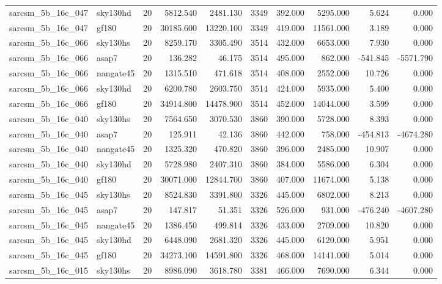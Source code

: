 \begin{longtable}{llrrrrrrrr}
sarcsm\_5b\_16c\_047 & sky130hd & 20 & 5812.540 & 2481.130 & 3349 & 392.000 & 5295.000 & 5.624 & 0.000 \\
sarcsm\_5b\_16c\_047 & gf180 & 20 & 30185.600 & 13220.100 & 3349 & 419.000 & 11561.000 & 3.189 & 0.000 \\
sarcsm\_5b\_16c\_066 & sky130hs & 20 & 8259.170 & 3305.490 & 3514 & 432.000 & 6653.000 & 7.930 & 0.000 \\
sarcsm\_5b\_16c\_066 & asap7 & 20 & 136.282 & 46.175 & 3514 & 495.000 & 862.000 & -541.845 & -5571.790 \\
sarcsm\_5b\_16c\_066 & nangate45 & 20 & 1315.510 & 471.618 & 3514 & 408.000 & 2552.000 & 10.726 & 0.000 \\
sarcsm\_5b\_16c\_066 & sky130hd & 20 & 6200.780 & 2603.750 & 3514 & 424.000 & 5935.000 & 5.400 & 0.000 \\
sarcsm\_5b\_16c\_066 & gf180 & 20 & 34914.800 & 14478.900 & 3514 & 452.000 & 14044.000 & 3.599 & 0.000 \\
sarcsm\_5b\_16c\_040 & sky130hs & 20 & 7564.650 & 3070.530 & 3860 & 390.000 & 5728.000 & 8.393 & 0.000 \\
sarcsm\_5b\_16c\_040 & asap7 & 20 & 125.911 & 42.136 & 3860 & 442.000 & 758.000 & -454.813 & -4674.280 \\
sarcsm\_5b\_16c\_040 & nangate45 & 20 & 1325.320 & 470.820 & 3860 & 396.000 & 2485.000 & 10.907 & 0.000 \\
sarcsm\_5b\_16c\_040 & sky130hd & 20 & 5728.980 & 2407.310 & 3860 & 384.000 & 5586.000 & 6.304 & 0.000 \\
sarcsm\_5b\_16c\_040 & gf180 & 20 & 30071.000 & 12844.700 & 3860 & 407.000 & 11674.000 & 5.138 & 0.000 \\
sarcsm\_5b\_16c\_045 & sky130hs & 20 & 8524.830 & 3391.800 & 3326 & 445.000 & 6802.000 & 8.213 & 0.000 \\
sarcsm\_5b\_16c\_045 & asap7 & 20 & 147.817 & 51.351 & 3326 & 526.000 & 931.000 & -476.240 & -4607.280 \\
sarcsm\_5b\_16c\_045 & nangate45 & 20 & 1386.450 & 499.814 & 3326 & 433.000 & 2709.000 & 10.820 & 0.000 \\
sarcsm\_5b\_16c\_045 & sky130hd & 20 & 6448.090 & 2681.320 & 3326 & 445.000 & 6120.000 & 5.951 & 0.000 \\
sarcsm\_5b\_16c\_045 & gf180 & 20 & 34273.100 & 14591.800 & 3326 & 468.000 & 14141.000 & 5.014 & 0.000 \\
sarcsm\_5b\_16c\_015 & sky130hs & 20 & 8986.090 & 3618.780 & 3381 & 466.000 & 7690.000 & 6.344 & 0.000 \\

\end{longtable}
